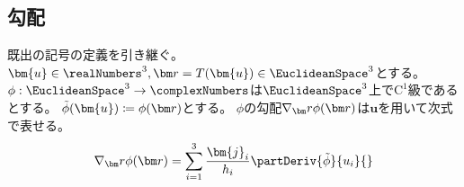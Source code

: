         \subsection{勾配}
            \label{勾配}
            \begin{shadebox}
                既出の記号の定義を引き継ぐ。
                $\bm{u}\in\realNumbers^3,\vr=T(\bm{u})\in\EuclideanSpace^3$とする。
                $\phi:\EuclideanSpace^3\to\complexNumbers$は$\EuclideanSpace^3$上で$\mathrm{C}^1$級であるとする。
                $\tilde{\phi}(\bm{u}) \coloneq \phi(\vr)$とする。
                $\phi$の勾配$\nabla_\vr\phi(\vr)$は$\bm{u}$を用いて次式で表せる。
                \[ \nabla_\vr\phi(\vr) = \sum_{i=1}^3\frac{\bm{j}_i}{h_i}\partDeriv{\tilde{\phi}}{u_i}{} \]
            \end{shadebox}
